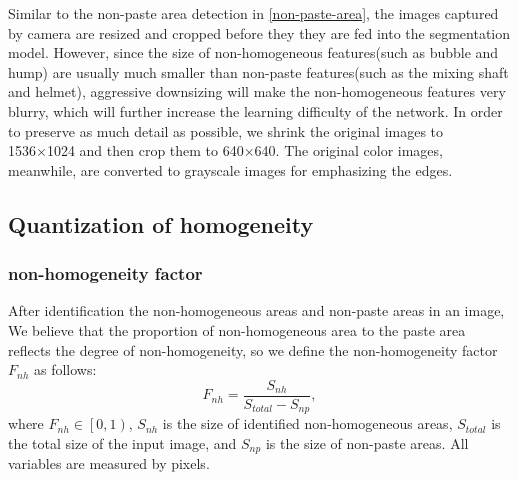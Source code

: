 \documentclass[pdflatex,sn-mathphys]{sn-jnl}%
\theoremstyle{thmstyleone}%
\theoremstyle{thmstyletwo}%
\theoremstyle{thmstylethree}%
\begin{document}
Similar to the non-paste area detection in \ref{non-paste-area},
the images captured by camera are resized and cropped before they they are fed into the segmentation model. 
However, since the size of non-homogeneous features(such as bubble and hump) are usually much smaller than non-paste features(such as the mixing shaft and helmet), aggressive downsizing will make the non-homogeneous features very blurry, which will further increase the learning difficulty of the network.
In order to preserve as much detail as possible, we shrink the original images to 1536×1024 and then crop them to 640×640.
The original color images, meanwhile, are converted to grayscale images for emphasizing the edges.


\subsection{Quantization of homogeneity}\label{sec2.3}

\subsubsection{non-homogeneity factor}\label{2.3.1}
After identification the non-homogeneous areas and non-paste areas in an image, We believe that the proportion of non-homogeneous area to the paste area reflects the degree of non-homogeneity, so we define the non-homogeneity factor $F_{nh}$ as follows:
\begin{equation}
\label{equ:prop_p}
F_{nh} = \frac{S_{nh}}{{S_{total} - S_{np}}},
\end{equation}
where $F_{nh}\in\left[0,1 \right)$, $S_{nh}$ is the size of identified non-homogeneous areas, $S_{total}$ is the total size of the input image, and $S_{np}$ is the size of non-paste areas.
All variables are measured by pixels.          
\end{document}
